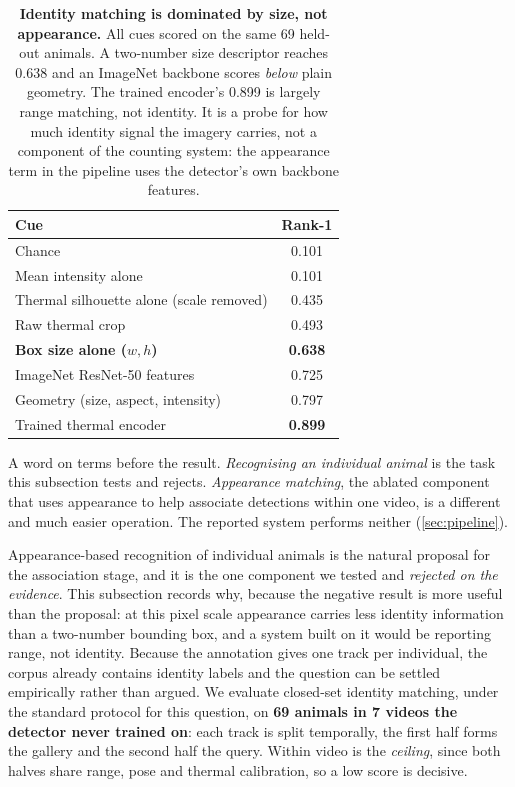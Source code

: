 \begin{table}[H]
\caption{\textbf{Identity matching is dominated by size, not appearance.} All cues scored on
the same 69 held-out animals. A two-number size descriptor reaches 0.638 and an ImageNet
backbone scores \emph{below} plain geometry. The trained encoder's 0.899 is largely range
matching, not identity. It is a probe for how much identity signal the imagery carries, not
a component of the counting system: the appearance term in the pipeline uses the detector's
own backbone features.\label{tab:reid}}
\centering
\begin{tabularx}{\textwidth}{lC}
\toprule
\textbf{Cue} & \textbf{Rank-1} \\
\midrule
Chance & 0.101 \\
Mean intensity alone & 0.101 \\
Thermal silhouette alone (scale removed) & 0.435 \\
Raw thermal crop & 0.493 \\
\textbf{Box size alone ($w,h$)} & \textbf{0.638} \\
ImageNet ResNet-50 features & 0.725 \\
Geometry (size, aspect, intensity) & 0.797 \\
Trained thermal encoder & \textbf{0.899} \\
\bottomrule
\end{tabularx}
\end{table}

A word on terms before the result. \emph{Recognising an individual animal} is the task this
subsection tests and rejects. \emph{Appearance matching}, the ablated component that uses
appearance to help associate detections within one video, is a different and much easier
operation. The reported system performs neither (\cref{sec:pipeline}).

Appearance-based recognition of individual animals is the natural proposal for the association stage, and it is the one component we tested and \emph{rejected on the evidence}. This
subsection records why, because the negative result is more useful than the proposal: at this
pixel scale appearance carries less identity information than a two-number bounding box, and
a system built on it would be reporting range, not identity. Because the annotation gives one
track per individual, the corpus already contains identity labels and the question can be
settled empirically rather than argued. We evaluate closed-set identity matching, under the standard protocol for this question, on \textbf{69 animals in 7 videos the detector never trained on}: each
track is split temporally, the first half forms the gallery and the second half the query.
Within video is the \emph{ceiling}, since both halves share range, pose and thermal
calibration, so a low score is decisive.

